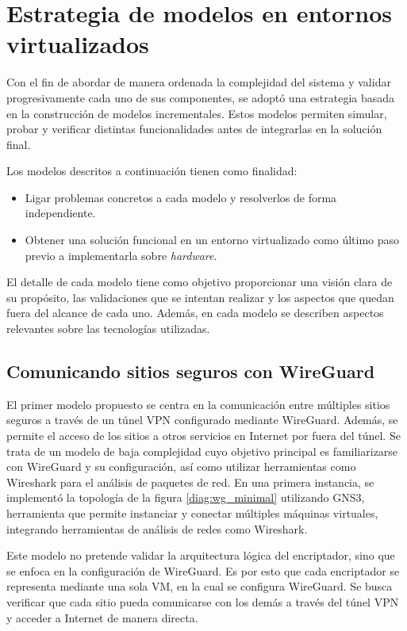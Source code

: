 \chapter{Estrategia de modelos en entornos virtualizados}

Con el fin de abordar de manera ordenada la complejidad del sistema y validar progresivamente cada uno de sus componentes, se adoptó una estrategia basada en la construcción de modelos incrementales. Estos modelos permiten simular, probar y verificar distintas funcionalidades antes de integrarlas en la solución final.

Los modelos descritos a continuación tienen como finalidad:
\begin{itemize}
    \item Ligar problemas concretos a cada modelo y resolverlos de forma independiente. %
    \item Obtener una solución funcional en un entorno virtualizado como último paso previo a implementarla sobre \textit{hardware}.
\end{itemize}

El detalle de cada modelo tiene como objetivo proporcionar una visión clara de su propósito, las validaciones que se intentan realizar y los aspectos que quedan fuera del alcance de cada uno. Además, en cada modelo se describen aspectos relevantes sobre las tecnologías utilizadas.

\section{Comunicando sitios seguros con WireGuard}
El primer modelo propuesto se centra en la comunicación entre múltiples sitios seguros a través de un túnel VPN configurado mediante WireGuard. Además, se permite el acceso de los sitios a otros servicios en Internet por fuera del túnel. Se trata de un modelo de baja complejidad cuyo objetivo principal es familiarizarse con WireGuard y su configuración, así como utilizar herramientas como Wireshark para el análisis de paquetes de red. En una primera instancia, se implementó la topología de la figura \ref{diag:wg_minimal} utilizando GNS3, herramienta que permite instanciar y conectar múltiples máquinas virtuales, integrando herramientas de análisis de redes como Wireshark. 

Este modelo no pretende validar la arquitectura lógica del encriptador, sino que se enfoca en la configuración de WireGuard. Es por esto que cada encriptador se representa mediante una sola VM, en la cual se configura WireGuard. Se busca verificar que cada sitio pueda comunicarse con los demás a través del túnel VPN y acceder a Internet de manera directa.

